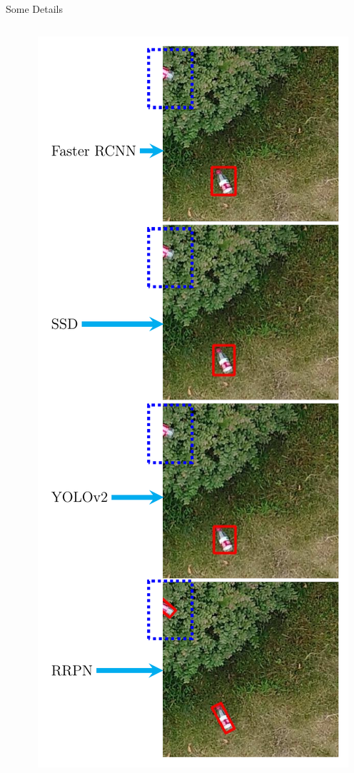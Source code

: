 \documentclass[newPxFont, fullfooter, sectionpages, progressbar, displaynote]{beamer}
\begin{document}
\begin{frame}{Some Details}
\begin{columns}
\begin{column}{.48\linewidth}
		\end{column}

		\begin{column}{.48\linewidth}
			\includegraphics[height=1.0\textheight]{images/results_room2.pdf}
		\end{column}
	\end{columns}

\end{frame}
\end{document}
